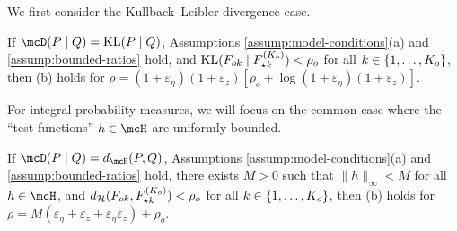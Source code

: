 We first consider the Kullback--Leibler divergence case.
%
\begin{proposition} \label{prop:kl-upper-bound}
	If $\mcD(P \mid Q) = \kl{P}{Q}$, Assumptions \ref{assump:model-conditions}(a) and \ref{assump:bounded-ratios} hold,
	and $\mathrm{KL}(F_{ok} \mid F_{\star k}^{(K_{o})}) < \rho_{o}$ for all $k \in \{1,\ldots, K_{o}\}$,
	then (b) holds for $\rho = (1+\varepsilon_{\eta})(1+\varepsilon_{z})[\rho_{o} + \log(1+\varepsilon_{\eta})(1+\varepsilon_{z})]$.
\end{proposition}


For integral probability measures, we will focus on the common case where the ``test functions'' $h \in \mcH$ are uniformly bounded.
\begin{proposition} \label{prop:IPM-metric-upper-bound}
	If $\mcD(P \mid Q) = d_{\mcH}(P, Q)$, Assumptions \ref{assump:model-conditions}(a) and
	\ref{assump:bounded-ratios} hold, there exists $M > 0$ such that $\|h\|_{\infty} < M$ for all $h \in \mcH$,
	and $d_{\mathcal{H}}(F_{ok},F^{(K_{o})}_{\star k}) < \rho_{o}$ for all $k \in \{1,\ldots, K_{o}\}$, then
	(b) holds for $\rho = M\left(\varepsilon_{\eta}+\varepsilon_{z}+\varepsilon_{\eta}\varepsilon_{z}\right) +\rho_{o}$.
\end{proposition}

